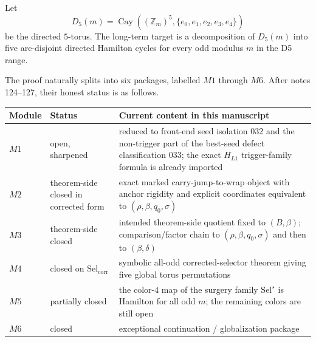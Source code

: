 \documentclass[11pt]{article}
\newcommand{\Z}{\mathbb Z}
\newcommand{\SelCorr}{\mathrm{Sel}_{\mathrm{corr}}}
\newcommand{\SelStar}{\mathrm{Sel}^{\star}}
\begin{document}
Let
\[
D_5(m)=\operatorname{Cay}((\Z_m)^5,\{e_0,e_1,e_2,e_3,e_4\})
\]
be the directed $5$-torus. The long-term target is a decomposition of
$D_5(m)$ into five arc-disjoint directed Hamilton cycles for every odd modulus
$m$ in the D5 range.

The proof naturally splits into six packages, labelled $M1$ through $M6$.
After notes 124--127, their honest status is as follows.

\begin{center}
\renewcommand{\arraystretch}{1.15}
\begin{tabularx}{\textwidth}{@{}>{\bfseries}l>{\raggedright\arraybackslash}p{2.6cm}X@{}}
\toprule
Module & Status & Current content in this manuscript \\
\midrule
$M1$ & open, sharpened & reduced to front-end seed isolation \textup{032} and the non-trigger part of the best-seed defect classification \textup{033}; the exact $H_{L1}$ trigger-family formula is already imported \\
$M2$ & theorem-side closed in corrected form & exact marked carry-jump-to-wrap object with anchor rigidity and explicit coordinates equivalent to $(\rho,\beta,q_0,\sigma)$ \\
$M3$ & theorem-side closed & intended theorem-side quotient fixed to $(B,\beta)$; comparison/factor chain to $(\rho,\beta,q_0,\sigma)$ and then to $(\beta,\delta)$ \\
$M4$ & closed on $\SelCorr$ & symbolic all-odd corrected-selector theorem giving five global torus permutations \\
$M5$ & partially closed & the color-$4$ map of the surgery family $\SelStar$ is Hamilton for all odd $m$; the remaining colors are still open \\
$M6$ & closed & exceptional continuation / globalization package \\
\bottomrule
\end{tabularx}
\end{center}
\end{document}
